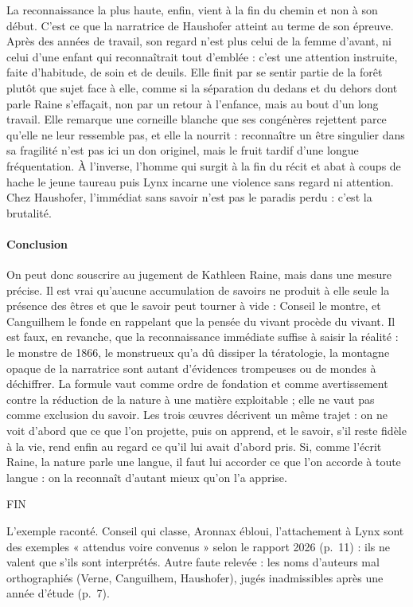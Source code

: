 \documentclass[11pt,a4paper]{article}
\begin{document}
La reconnaissance la plus haute, enfin, vient à la fin du chemin et non à son début. C'est ce que la narratrice de Haushofer atteint au terme de son épreuve. Après des années de travail, son regard n'est plus celui de la femme d'avant, ni celui d'une enfant qui reconnaîtrait tout d'emblée : c'est une attention instruite, faite d'habitude, de soin et de deuils. Elle finit par se sentir partie de la forêt plutôt que sujet face à elle, comme si la séparation du dedans et du dehors dont parle Raine s'effaçait, non par un retour à l'enfance, mais au bout d'un long travail. Elle remarque une corneille blanche que ses congénères rejettent parce qu'elle ne leur ressemble pas, et elle la nourrit : reconnaître un être singulier dans sa fragilité n'est pas ici un don originel, mais le fruit tardif d'une longue fréquentation. À l'inverse, l'homme qui surgit à la fin du récit et abat à coups de hache le jeune taureau puis Lynx incarne une violence sans regard ni attention. Chez Haushofer, l'immédiat sans savoir n'est pas le paradis perdu : c'est la brutalité.

\hypertarget{conclusion}{%
\paragraph{Conclusion}\label{conclusion}}

On peut donc souscrire au jugement de Kathleen Raine, mais dans une mesure précise. Il est vrai qu'aucune accumulation de savoirs ne produit à elle seule la présence des êtres et que le savoir peut tourner à vide : Conseil le montre, et Canguilhem le fonde en rappelant que la pensée du vivant procède du vivant. Il est faux, en revanche, que la reconnaissance immédiate suffise à saisir la réalité : le monstre de 1866, le monstrueux qu'a dû dissiper la tératologie, la montagne opaque de la narratrice sont autant d'évidences trompeuses ou de mondes à déchiffrer. La formule vaut comme ordre de fondation et comme avertissement contre la réduction de la nature à une matière exploitable ; elle ne vaut pas comme exclusion du savoir. Les trois œuvres décrivent un même trajet : on ne voit d'abord que ce que l'on projette, puis on apprend, et le savoir, s'il reste fidèle à la vie, rend enfin au regard ce qu'il lui avait d'abord pris. Si, comme l'écrit Raine, la nature parle une langue, il faut lui accorder ce que l'on accorde à toute langue : on la reconnaît d'autant mieux qu'on l'a apprise.

FIN

\begin{piege}

L'exemple raconté. Conseil qui classe, Aronnax ébloui, l'attachement à Lynx sont des exemples « attendus voire convenus » selon le rapport 2026 (p.~11) : ils ne valent que s'ils sont interprétés. Autre faute relevée : les noms d'auteurs mal orthographiés (Verne, Canguilhem, Haushofer), jugés inadmissibles après une année d'étude (p.~7).

\end{piege}
\end{document}
